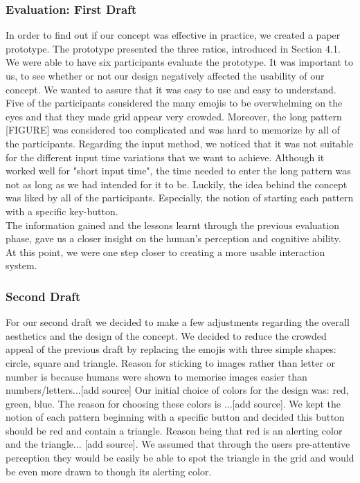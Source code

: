 \subsubsection{Evaluation: First Draft} \label{4.2.2.2}
In order to find out if our concept was effective in practice, we created a paper prototype. The prototype presented the three ratios, introduced in Section 4.1. We were able to have six participants evaluate the prototype. It was important to us, to see whether or not our design negatively affected the usability of our concept. We wanted to assure that it was easy to use and easy to understand.
Five of the participants considered the many emojis to be overwhelming on the eyes and that they made grid appear very crowded. Moreover, the long pattern [FIGURE] was considered too complicated and was hard to memorize by all of the participants. Regarding the input method, we noticed that it was not suitable for the different input time variations that we want to achieve. Although it worked well for "short input time", the time needed to enter the long pattern was not as long as we had intended for it to be. 
Luckily, the idea behind the concept was liked by all of the participants. Especially, the notion of starting each pattern with a specific key-button. \\

The information gained and the lessons learnt through the previous evaluation phase, gave us a closer insight on the human's perception and cognitive ability. At this point, we were one step closer to creating a more usable interaction system.

\subsubsection{Second Draft} \label{4.2.2.3}

For our second draft we decided to make a few adjustments regarding the overall aesthetics and the design of the concept. We decided to reduce the crowded appeal of the previous draft by replacing the emojis with three simple shapes: circle, square and triangle. Reason for sticking to images rather than letter or number is because humans were shown to memorise images easier than numbers/letters...[add source] Our initial choice of colors for the design was: red, green, blue. The reason for choosing these colors is ...[add source]. We kept the notion of each pattern beginning with a specific button and decided this button should be red and contain a triangle. Reason being that red is an alerting color and the triangle... [add source]. We assumed that through the users pre-attentive perception they would be easily be able to spot the triangle in the grid and would be even more drawn to though its alerting color. \\

